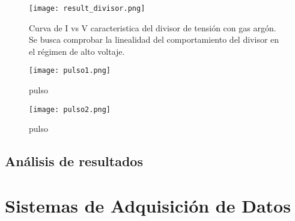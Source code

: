 \documentclass{report}
\begin{document}
\begin{figure}[H]
    \centering
    \texttt{[image: result\_divisor.png]}
    \caption{Curva de I vs V caracteristica del divisor de tensión con gas argón. Se busca comprobar la linealidad del comportamiento del divisor en el régimen de alto voltaje.}
    \label{fig:result_divisor}
\end{figure}

\begin{figure}[H]
    \centering
    \texttt{[image: pulso1.png]}
    \caption{pulso}
    \label{fig:pulso2}
\end{figure}

\begin{figure}[H]
    \centering
    \texttt{[image: pulso2.png]}
    \caption{pulso}
    \label{fig:pulso1}
\end{figure}

\newpage
\section{Análisis de resultados}

\newpage
\chapter{\centering Sistemas de Adquisición de Datos}

\vspace{1cm}



\end{document}
